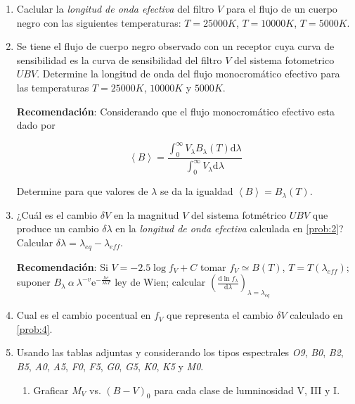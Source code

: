 \documentclass[12pt,spanish,a4paper]{practice}
\begin{document}
\begin{enumerate}[wide, labelwidth=!, labelindent=0pt, label=\textbf{\arabic*)}, ref=\arabic*]
        \item \label{prob:2} Caclular la \emph{longitud de onda efectiva} del filtro $V$ para el flujo de un cuerpo negro con las siguientes temperaturas: $T = 25000 K$, $T = 10000 K$, $T = 5000 K$.

        \item \label{prob:3} Se tiene el flujo de cuerpo negro observado con un receptor cuya curva de sensibilidad es la curva de sensibilidad del filtro $V$ del sistema fotometrico $UBV$. Determine la longitud de onda del flujo monocromático efectivo para las temperaturas $T = 25000 K$, $10000 K$ y $5000 K$.

        \textbf{Recomendación}: Considerando que el flujo monocromático efectivo esta dado por

            $$\left\langle B\right\rangle = \frac{\displaystyle{\int_{0}^{\infty} V_{\lambda} B_{\lambda} \left(T\right) \mathrm{d}\lambda}}{\displaystyle{\int_{0}^{\infty} V_{\lambda} \mathrm{d}\lambda}}$$

        Determine para que valores de $\lambda$ se da la igualdad $\left\langle B\right\rangle = B_{\lambda} \left(T\right)$.

        \item \label{prob:4} ¿Cuál es el cambio $\delta V$ en la magnitud $V$ del sistema fotmétrico $UBV$ que produce un cambio $\delta\lambda$ en la \emph{longitud de onda efectiva} calculada en \ref{prob:2}? Calcular $\delta\lambda = {\lambda}_{eq} - {\lambda}_{eff}$.

        \textbf{Recomendación}: Si $V = -2.5 \log f_V + C$ tomar $f_V \simeq B\left(T\right) $, $T=T\left({\lambda}_{eff}\right)$; suponer $B_{\lambda}\ \alpha\ {\lambda}^{-v} \mathrm{e}^{-\frac{hc}{\lambda k T}}$ ley de Wien; calcular $\left(\frac{\mathrm{d} \ln {f}_{\lambda}}{\mathrm{d}\lambda}\right)_{\lambda = {\lambda}_{eq}}$

        \item \label{prob:5} Cual es el cambio pocentual en $f_V$ que representa el cambio $\delta V$ calculado en \ref{prob:4}.

        \item \label{prob:6} Usando las tablas adjuntas y considerando los tipos espectrales \emph{O9}, \emph{B0}, \emph{B2}, \emph{B5}, \emph{A0}, \emph{A5}, \emph{F0}, \emph{F5}, \emph{G0}, \emph{G5}, \emph{K0}, \emph{K5} y \emph{M0}.

        \begin{enumerate}[label=\alph*., ref=\theenumi\alph*]
            \item Graficar $M_V$ vs. $\left(B-V\right)_{0}$ para cada clase de lumninosidad V, III y I.


\end{enumerate}
\end{enumerate}
\end{document}

